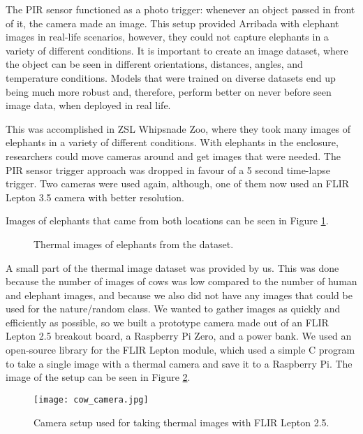 The PIR sensor functioned as a photo trigger: whenever an object passed in front of it, the camera made an image.
This setup provided Arribada with elephant images in real-life scenarios, however, they could not capture elephants in a variety of different conditions. 
It is important to create an image dataset, where the object can be seen in different orientations, distances, angles, and temperature conditions.
Models that were trained on diverse datasets end up being much more robust and, therefore, perform better on never before seen image data, when deployed in real life.

This was accomplished in ZSL Whipsnade Zoo, where they took many images of elephants in a variety of different conditions\cite{dataset_collection}.
With elephants in the enclosure, researchers could move cameras around and get images that were needed.
The PIR sensor trigger approach was dropped in favour of a 5 second time-lapse trigger.
Two cameras were used again, although, one of them now used an FLIR Lepton 3.5 camera with better resolution.

Images of elephants that came from both locations can be seen in Figure \ref{four_elephants}.
\newline
\begin{figure}[ht]
    \centering
    \caption{Thermal images of elephants from the dataset.}
    \label{four_elephants}
\end{figure}


A small part of the thermal image dataset was provided by us. This was done because the number of images of cows was low compared to the number of human and elephant images, and because we also did not have any images that could be used for the nature/random class.
We wanted to gather images as quickly and efficiently as possible, so we built a prototype camera made out of an FLIR Lepton 2.5 breakout board, a Raspberry Pi Zero, and a power bank.
We used an open-source library \cite{flir_github} for the FLIR Lepton module, which used a simple C program to take a single image with a thermal camera and save it to a Raspberry Pi.
The image of the setup can be seen in Figure \ref{cow_camera}.
\newline
\begin{figure}[ht]
    \centering
    \texttt{[image: cow\_camera.jpg]} 
    \caption{Camera setup used for taking thermal images with FLIR Lepton 2.5.}
    \label{cow_camera}
\end{figure}

